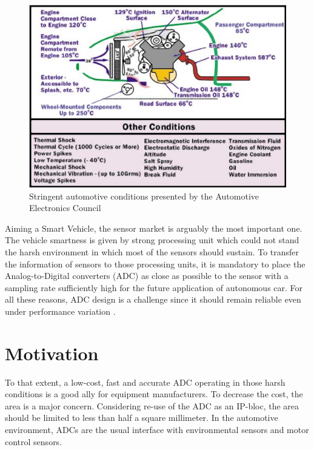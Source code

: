 \begin{figure}[htp]
	\centering
	\includegraphics[width=.8\textwidth]{Chapter1/Figs/automotive_cond.png}
	\caption{Stringent automotive conditions presented by the Automotive Electronics Council~\cite{1393072,ISO16750}}
	\label{fig:automotive-cond}
\end{figure}

Aiming a Smart Vehicle, the sensor market is arguably the most important one. The vehicle smartness is given by strong processing unit which could not stand the harsh environment in which most of the sensors should sustain. To transfer the information of sensors to those processing units, it is mandatory to place the Analog-to-Digital converters (ADC) as close as possible to the sensor with a sampling rate sufficiently high for the future application of autonomous car. For all these reasons, ADC design is a challenge since it should remain reliable even under performance variation \cite{Cai2012}.

\section{Motivation}   %
To that extent, a low-cost, fast and accurate ADC operating in those harsh conditions is a good ally for equipment manufacturers. To decrease the cost, the area is a major concern. Considering re-use of the ADC as an IP-bloc, the area should be limited to less than half a square millimeter.
In the automotive environment, ADCs are the usual interface with environmental sensors and motor control sensors.

